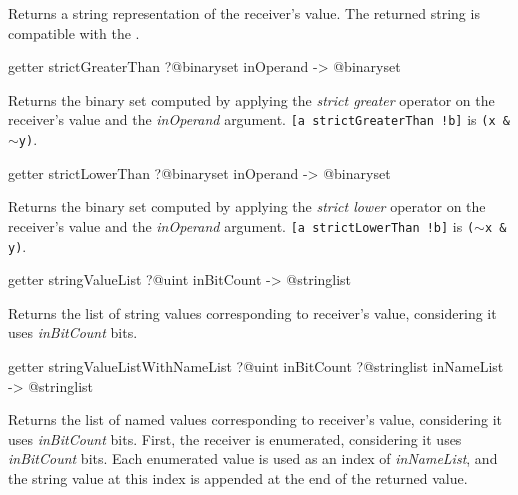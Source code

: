 Returns a string representation of the receiver's value. The returned string is compatible with the .








\begin{galgas}
getter strictGreaterThan ?@binaryset inOperand -> @binaryset
\end{galgas}

Returns the binary set computed by applying the \emph{strict greater} operator on the receiver's value and the \emph{inOperand} argument.
{\texttt{[a strictGreaterThan !b]} is \texttt{(x \& $\sim$y)}.}








\begin{galgas}
getter strictLowerThan ?@binaryset inOperand -> @binaryset
\end{galgas}

Returns the binary set computed by applying the \emph{strict lower} operator on the receiver's value and the \emph{inOperand} argument.
{\texttt{[a strictLowerThan !b]} is \texttt{($\sim$x \& y)}.}








\begin{galgas}
getter stringValueList ?@uint inBitCount -> @stringlist
\end{galgas}

Returns the list of string values corresponding to receiver's value, considering it uses \emph{inBitCount} bits.








\begin{galgas}
getter stringValueListWithNameList
  ?@uint inBitCount
  ?@stringlist inNameList
  -> @stringlist
\end{galgas}


Returns the list of named values corresponding to receiver's value, considering it uses \emph{inBitCount} bits. First, the receiver is enumerated, considering it uses \emph{inBitCount} bits. Each enumerated value is used as an index of \emph{inNameList}, and the string value at this index is appended at the end of the returned value.







